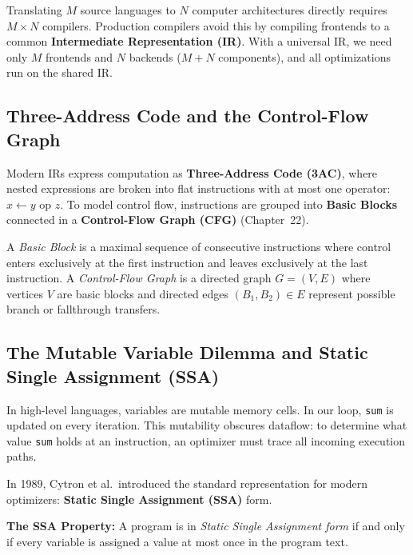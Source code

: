Translating $M$ source languages to $N$ computer architectures directly requires
$M \times N$ compilers. Production compilers avoid this by compiling frontends
to a common \textbf{Intermediate Representation (IR)}. With a universal IR, we
need only $M$ frontends and $N$ backends ($M + N$ components), and all
optimizations run on the shared IR.

\subsection{Three-Address Code and the Control-Flow Graph}

Modern IRs express computation as \textbf{Three-Address Code (3AC)}, where
nested expressions are broken into flat instructions with at most one operator:
$x \leftarrow y \text{ op } z$. To model control flow, instructions are grouped
into \textbf{Basic Blocks} connected in a \textbf{Control-Flow Graph (CFG)}
(Chapter~22).

\begin{definition}
\label{ch41:def-cfg-block}
A \emph{Basic Block} is a maximal sequence of consecutive instructions where
control enters exclusively at the first instruction and leaves exclusively at
the last instruction. A \emph{Control-Flow Graph} is a directed graph $G = (V, E)$
where vertices $V$ are basic blocks and directed edges $(B_1, B_2) \in E$
represent possible branch or fallthrough transfers.
\end{definition}

\subsection{The Mutable Variable Dilemma and Static Single Assignment (SSA)}

In high-level languages, variables are mutable memory cells. In our loop,
\texttt{sum} is updated on every iteration. This mutability obscures dataflow:
to determine what value \texttt{sum} holds at an instruction, an optimizer must
trace all incoming execution paths.

In 1989, Cytron et al.\ introduced the standard representation for modern
optimizers: \textbf{Static Single Assignment (SSA)} form.

\begin{formalbox}
\textbf{The SSA Property:} A program is in \emph{Static Single Assignment form}
if and only if every variable is assigned a value at most once in the program text.
\end{formalbox}


